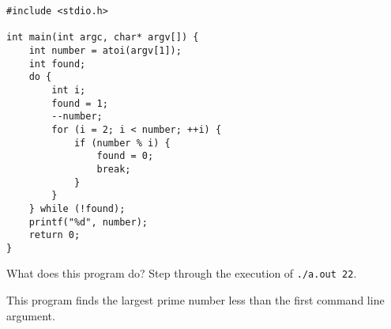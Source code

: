\begin{verbatim}
#include <stdio.h>

int main(int argc, char* argv[]) {
    int number = atoi(argv[1]);
    int found;
    do {
        int i;
        found = 1;
        --number;
        for (i = 2; i < number; ++i) {
            if (number % i) {
                found = 0;
                break;
            }
        }
    } while (!found);
    printf("%d", number);
    return 0;
}
\end{verbatim}

What does this program do? Step through the execution of \texttt{./a.out 22}.

\begin{answer}
This program finds the largest prime number less than the first command line argument.

\end{answer}